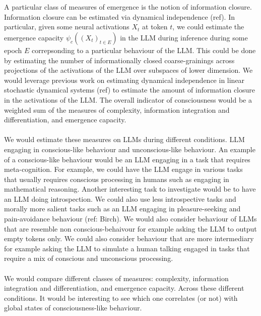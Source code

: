 \documentclass[11pt,a4paper]{article}
\begin{document}
\\
\\
A particular class of measures of emergence is the notion of information closure. Information closure can be estimated via dynamical independence (ref). In particular, given some neural activations $X_t$ at token $t$, we could estimate the emergence capacity $\psi_c((X_t)_{t\in E})$ in the LLM during inference during some epoch $E$ correpsonding to a particular behaviour of the LLM. This could be done by estimating the number of informationally closed coarse-grainings across projections of the activations of the LLM over subspaces of lower dimension. We would leverage previous work on estimating dynamical independence in linear stochastic dynamical systems (ref) to estimate the amount of information closure in the activations of the LLM. 
The overall indicator of consciousness would be a weighted sum of the measures of complexity, information integration and differentiation, and emergence capacity.
\\
\\
We would estimate these measures on LLMs during different conditions. LLM engaging in conscious-like behaviour and unconscious-like behaviour. An example of a conscious-like behaviour would be an LLM engaging in a task that requires meta-cognition. For example, we could have the LLM engage in various tasks that usually requires conscious processing in humans such as engaging in mathematical reasoning. Another interesting task to investigate would be to have an LLM doing introspection. We could also use less introspective tasks and morally more salient tasks such as an LLM engaging in pleasure-seeking and pain-avoidance behaviour (ref: Birch). We would also consider behaviour of LLMs that are resemble non conscious-behaivour for example asking the LLM to output empty tokens only. We could also consider behaviour that are more intermediary for example asking the LLM to simulate a human talking engaged in tasks that require a mix of conscious and unconscious processing.
\\
\\
We would compare different classes of measures: complexity, information integration and differentiation, and emergence capacity. Across these different conditions. It would be interesting to see which one correlates (or not) with global states of consciousness-like behaviour.
\end{document}
